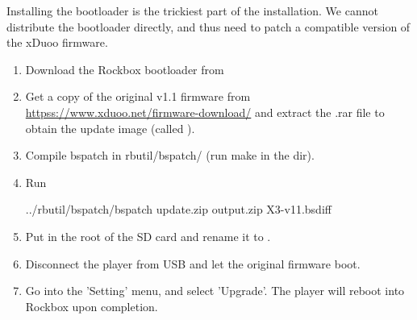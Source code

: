   Installing the bootloader is the trickiest part of the installation.
  We cannot distribute the bootloader directly, and thus need to patch a compatible
  version of the xDuoo firmware.

\begin{enumerate}

\item Download the Rockbox bootloader from

\item Get a copy of the original \playertype{} v1.1 firmware from
  \url{httpss://www.xduoo.net/firmware-download/} and extract the .rar file to obtain the
  update image (called ).

\item Compile bspatch in rbutil/bspatch/ (run make in the dir).

\item Run
\begin{code}
    ../rbutil/bspatch/bspatch update.zip output.zip X3-v11.bsdiff
\end{code}

\item Put  in the root of the SD card and rename it to .

\item Disconnect the player from USB and let the original firmware boot.

\item Go into the 'Setting' menu, and select 'Upgrade'. The player will reboot into Rockbox
  upon completion.

\end{enumerate}
